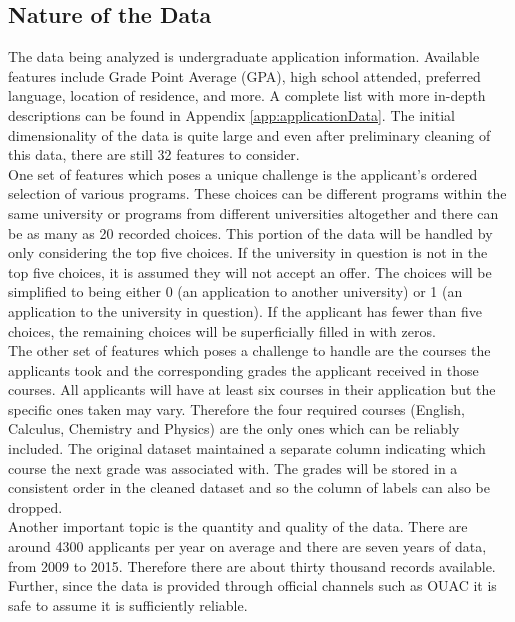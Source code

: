 \documentclass[titlepage]{article}
\begin{document}
\subsection{Nature of the Data}
The data being analyzed is undergraduate application information. Available features include Grade Point Average (GPA), high school attended, preferred language, location of residence, and more. A complete list with more in-depth descriptions can be found in Appendix \ref{app:applicationData}. The initial dimensionality of the data is quite large and even after preliminary cleaning of this data, there are still 32 features to consider.\\
One set of features which poses a unique challenge is the applicant's ordered selection of various programs. These choices can be different programs within the same university or programs from different universities altogether and there can be as many as 20 recorded choices. This portion of the data will be handled by only considering the top five choices. If the university in question is not in the top five choices, it is assumed they will not accept an offer. The choices will be simplified to being either 0 (an application to another university) or 1 (an application to the university in question). If the applicant has fewer than five choices, the remaining choices will be superficially filled in with zeros.\\
The other set of features which poses a challenge to handle are the courses the applicants took and the corresponding grades the applicant received in those courses. All applicants will have at least six courses in their application but the specific ones taken may vary. Therefore the four required courses (English, Calculus, Chemistry and Physics) are the only ones which can be reliably included. The original dataset maintained a separate column indicating which course the next grade was associated with. The grades will be stored in a consistent order in the cleaned dataset and so the column of labels can also be dropped.\\
Another important topic is the quantity and quality of the data. There are around 4300 applicants per year on average and there are seven years of data, from 2009 to 2015. Therefore there are about thirty thousand records available. Further, since the data is provided through official channels such as OUAC it is safe to assume it is sufficiently reliable.
\end{document}
